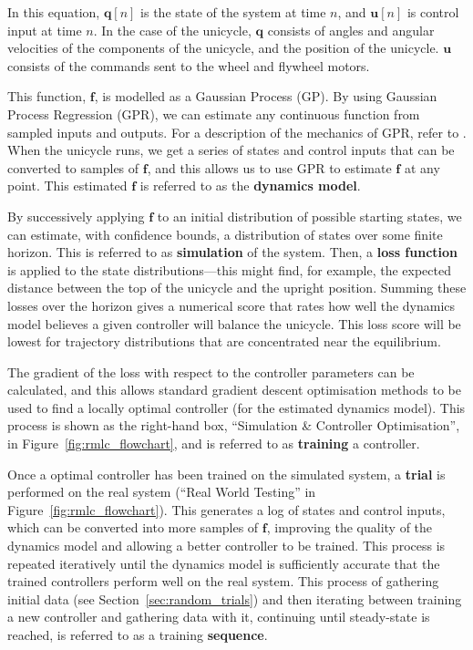 \documentclass{IIBproject}
\begin{document}
In this equation, $\boldsymbol{q}[n]$ is the state of the system at time $n$,
and $\boldsymbol{u}[n]$ is control input at time $n$. In the case of the
unicycle, $\boldsymbol{q}$ consists of angles and angular velocities of the
components of the unicycle, and the position of the unicycle.
$\boldsymbol{u}$ consists of the commands sent to the wheel and flywheel
motors.

This function, $\boldsymbol{f}$, is modelled as a Gaussian Process (GP). By
using Gaussian Process Regression (GPR), we can estimate any continuous
function from sampled inputs and outputs. For a description of the mechanics
of GPR, refer to \cite{ref:gpml}. When the unicycle runs, we get
a series of states and control inputs that can be converted to samples of
$\boldsymbol{f}$, and this allows us to use GPR to estimate
$\boldsymbol{f}$ at any point. This estimated $\boldsymbol{f}$ is referred to
as the \textbf{dynamics model}.

By successively applying $\boldsymbol{f}$ to an initial distribution of
possible starting states, we can estimate, with confidence bounds, a
distribution of states over some finite horizon. This is referred to as
\textbf{simulation} of the system. Then, a \textbf{loss function} is applied
to the state distributions---this might find, for example, the expected
distance between the top of the unicycle and the upright position.  Summing
these losses over the horizon gives a numerical score that rates how well the
dynamics model believes a given controller will balance the unicycle. This
loss score will be lowest for trajectory distributions that are concentrated
near the equilibrium.

The gradient of the loss with respect to the controller parameters can be
calculated, and this allows standard gradient descent optimisation methods to
be used to find a locally optimal controller (for the estimated dynamics
model). This process is shown as the right-hand box, ``Simulation \&
Controller Optimisation'', in Figure~\ref{fig:rmlc_flowchart}, and is referred
to as \textbf{training} a controller.

Once a optimal controller has been trained on the simulated system, a
\textbf{trial} is performed on the real system (``Real World Testing'' in
Figure~\ref{fig:rmlc_flowchart}). This generates a log of states and control
inputs, which can be converted into more samples of $\boldsymbol{f}$,
improving the quality of the dynamics model and allowing a better controller
to be trained. This process is repeated iteratively until the dynamics model
is sufficiently accurate that the trained controllers perform well on the real
system. This process of gathering initial data (see
Section~\ref{sec:random_trials}) and then iterating between training a new
controller and gathering data with it, continuing until steady-state is
reached, is referred to as a training \textbf{sequence}.
\end{document}
